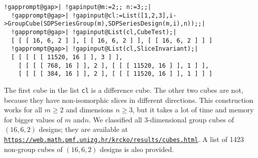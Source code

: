 \documentclass[a4paper,11pt]{report}
\begin{document}
{{\begin{Verbatim}[commandchars=!@|,fontsize=\small,frame=single,label=Example]
  !gapprompt@gap>| !gapinput@m:=2;; n:=3;;|
  !gapprompt@gap>| !gapinput@cl:=List([1,2,3],i->GroupCube(SDPSeriesGroup(m),SDPSeriesDesign(m,i),n));;|
  !gapprompt@gap>| !gapinput@List(cl,CubeTest);|
  [ [ [ 16, 6, 2 ] ], [ [ 16, 6, 2 ] ], [ [ 16, 6, 2 ] ] ]
  !gapprompt@gap>| !gapinput@List(cl,SliceInvariant);|
  [ [ [ [ [ 11520, 16 ] ], 3 ] ], 
    [ [ [ [ 768, 16 ] ], 2 ], [ [ [ 11520, 16 ] ], 1 ] ], 
    [ [ [ [ 384, 16 ] ], 2 ], [ [ [ 11520, 16 ] ], 1 ] ] ]
\end{Verbatim}
 The first cube in the list \texttt{cl} is a difference cube. The other two cubes are not, because they have
non-isomorphic slices in different directions. This construction works for all $m\ge 2$ and dimensions $n\ge 3$, but it takes a lot of time and memory for bigger values of $m$ and{\nobreakspace}$n$. We classified all 3-dimensional group cubes of $(16,6,2)$ designs; they are available at \href{https://web.math.pmf.unizg.hr/~krcko/results/cubes.html} {\texttt{https://web.math.pmf.unizg.hr/\texttt{}krcko/results/cubes.html}}. A list of 1423 non-group cubes of $(16,6,2)$ designs is also provided. 

}}
\end{document}

